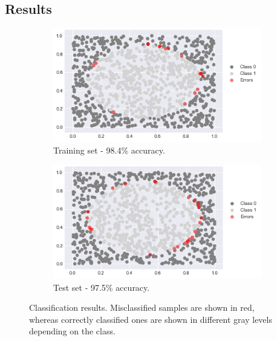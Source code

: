\documentclass[10pt,conference,compsocconf]{IEEEtran}
\begin{document}
    \subsection{Results} %
    \label{sub:results}
        \begin{figure}[t]
            \centering
            \begin{subfigure}{0.45\linewidth}
                \centering
                \includegraphics[width=\linewidth]{figures/res_circle_tr.png}
                \caption{Training set - 98.4\% accuracy.}
                \label{fig:rescircletr}
            \end{subfigure}%
            \begin{subfigure}{0.45\linewidth}
            \centering
            \includegraphics[width=\linewidth]{figures/res_circle_te.png}
            \caption{Test set - 97.5\% accuracy.}
            \label{fig:rescirclete}
            \end{subfigure}
            \caption{Classification results. Misclassified samples are shown in red, whereas correctly classified ones are shown in different gray levels depending on the class.}
            \label{fig:rescircle}
        \end{figure}
\end{document}

